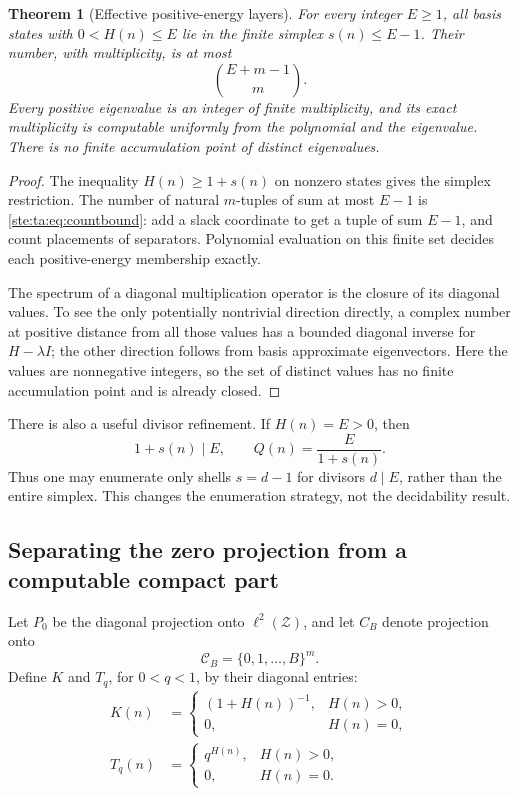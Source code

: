 \documentclass[11pt,letterpaper]{article}
\newtheorem{theorem}{Theorem}[section]
\theoremstyle{definition}
\theoremstyle{remark}
\newcommand{\cB}{\mathcal C_B}
\begin{document}
\begin{theorem}[Effective positive-energy layers]\label{ste:ta:thm:layers}
For every integer $E\ge1$, all basis states with $0<H(n)\le E$ lie in the finite simplex $s(n)\le E-1$. Their number, with multiplicity, is at most
\begin{equation}\label{ste:ta:eq:countbound}
\binom{E+m-1}{m}.
\end{equation}
Every positive eigenvalue is an integer of finite multiplicity, and its exact multiplicity is computable uniformly from the polynomial and the eigenvalue. There is no finite accumulation point of distinct eigenvalues.
\end{theorem}
\begin{proof}
The inequality $H(n)\ge1+s(n)$ on nonzero states gives the simplex restriction. The number of natural $m$-tuples of sum at most $E-1$ is \eqref{ste:ta:eq:countbound}: add a slack coordinate to get a tuple of sum $E-1$, and count placements of separators. Polynomial evaluation on this finite set decides each positive-energy membership exactly.

The spectrum of a diagonal multiplication operator is the closure of its diagonal values. To see the only potentially nontrivial direction directly, a complex number at positive distance from all those values has a bounded diagonal inverse for $H-\lambda I$; the other direction follows from basis approximate eigenvectors. Here the values are nonnegative integers, so the set of distinct values has no finite accumulation point and is already closed.
\end{proof}

There is also a useful divisor refinement. If $H(n)=E>0$, then
\begin{equation}\label{ste:ta:eq:divisors}
1+s(n)\mid E,\qquad Q(n)=\frac{E}{1+s(n)}.
\end{equation}
Thus one may enumerate only shells $s=d-1$ for divisors $d\mid E$, rather than the entire simplex. This changes the enumeration strategy, not the decidability result.

\subsection{Separating the zero projection from a computable compact part}
Let $P_0$ be the diagonal projection onto $\ell^2(\mathcal Z)$, and let $C_B$ denote projection onto
\[
\cB=\{0,1,\ldots,B\}^m.
\]
Define $K$ and $T_q$, for $0<q<1$, by their diagonal entries:
\begin{align}
K(n)&=\begin{cases}(1+H(n))^{-1},&H(n)>0,\\0,&H(n)=0,\end{cases}\label{ste:ta:eq:K}\\
T_q(n)&=\begin{cases}q^{H(n)},&H(n)>0,\\0,&H(n)=0.\end{cases}\label{ste:ta:eq:T}
\end{align}
\end{document}
